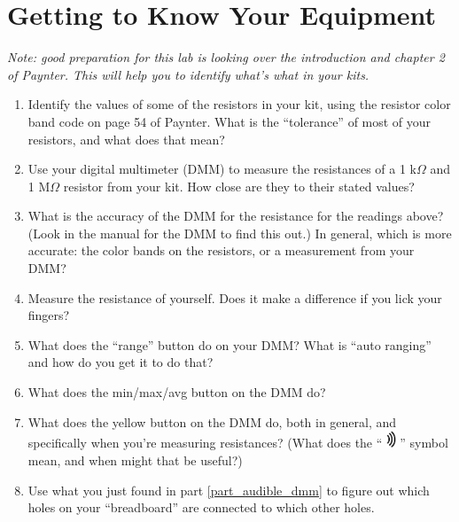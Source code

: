 \section{Getting to Know Your Equipment}


\bigskip

\textit{Note: good preparation for this lab is looking over the introduction and chapter 2 of Paynter.  This will help you to identify what's what in your kits.}

\begin{enumerate}[wide]

\item Identify the values of some of the resistors in your kit, using the resistor color band code on page 54 of Paynter.  What is the ``tolerance'' of most of your resistors, and what does that mean?   

\item Use your digital multimeter (DMM) to measure the resistances of a 1 k$\Omega$ and 1 M$\Omega$ resistor from your kit.  How close are they to their stated values?

\item What is the accuracy of the DMM for the resistance for the readings above?  (Look in the manual for the DMM to find this out.)  In general, which is more accurate: the color bands on the resistors, or a measurement from your DMM?

\item Measure the resistance of yourself.  Does it make a difference if you lick your fingers?  

\item What does the ``range'' button do on your DMM?  What is ``auto ranging'' and how do you get it to do that?

\item What does the min/max/avg button on the DMM do?

\item What does the yellow button on the DMM do, both in general, and specifically when you're measuring resistances?  (What does the ``
\includegraphics[height=0.2in]{equipment/sound.eps}
'' symbol mean, and when might that be useful?) \label{part_audible_dmm}

\item Use what you just found in part \ref{part_audible_dmm} to figure out which holes on your ``breadboard'' are connected to which other holes.   


\end{enumerate}
